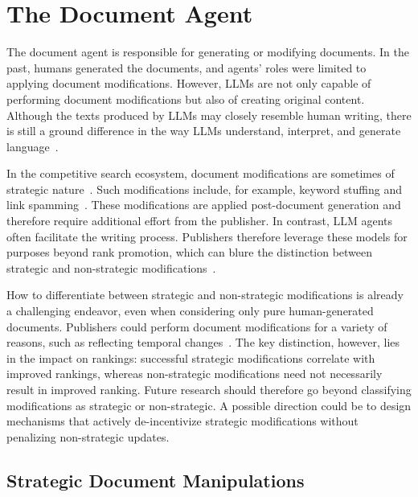 \section{The Document Agent}
\label{sec:docAgent}

The document agent is responsible for generating or modifying documents. In the past, humans generated the documents, and agents' roles were limited to applying document modifications. However, LLMs are not only capable of performing document modifications but also of creating original content. Although the texts produced by LLMs may closely resemble human writing, there is still a ground difference in the way LLMs understand, interpret, and generate language~\cite{llm-parrots, how-llms-understand-language, tortured-phrases}.

In the competitive search ecosystem, document modifications are sometimes of strategic nature~\cite{Greg-bot, kurland_competitive_2022}.
Such modifications include, for example, keyword stuffing and link spamming~\cite{Gyongyi+Molina:05a}. 
These modifications are applied post-document generation and therefore require additional effort from the publisher. 
In contrast, LLM agents often facilitate the writing process.
Publishers therefore leverage these models for purposes beyond rank promotion, which can blure the distinction between strategic and non-strategic modifications~\cite{gpt-papers}.

How to differentiate between strategic and non-strategic modifications is already a challenging endeavor, even when considering only pure human-generated documents. Publishers could perform document modifications for a variety of reasons, such as reflecting temporal changes~\cite{temporal-web-dynamics}. The key distinction, however, lies in the impact on rankings: successful strategic modifications correlate with improved rankings, whereas non-strategic modifications need not necessarily result in improved ranking.
Future research should therefore go beyond classifying modifications as strategic or non-strategic. A possible direction could be to design mechanisms that actively de-incentivize strategic modifications without penalizing non-strategic updates. 

\subsection{Strategic Document Manipulations}

